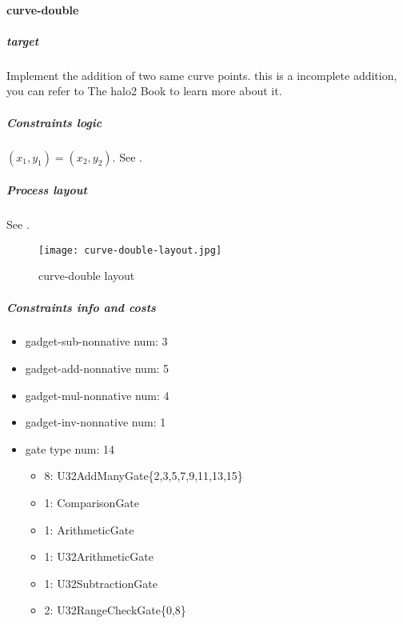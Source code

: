 \paragraph{curve-double}

\subparagraph{target}
Implement the addition of two same curve points. this is a incomplete addition, you can refer to The halo2 Book \cite{website:halo2-book} to learn more about it.

\subparagraph{Constraints logic}
$(x_1,y_1) = (x_2,y_2)$. See .

\subparagraph{Process layout}
See .
\begin{figure}[!ht]
    \centering
    \texttt{[image: curve-double-layout.jpg]}
    \caption{curve-double layout}
    \label{fig:curve-double-layout}
\end{figure}

\subparagraph{Constraints info and costs}
\begin{itemize}
    \item gadget-sub-nonnative num: 3
    \item gadget-add-nonnative num: 5
    \item gadget-mul-nonnative num: 4
    \item gadget-inv-nonnative num: 1
    \item gate type num: 14
        \begin{itemize}
            \item 8: U32AddManyGate\{2,3,5,7,9,11,13,15\}
            \item 1: ComparisonGate
            \item 1: ArithmeticGate
            \item 1: U32ArithmeticGate
            \item 1: U32SubtractionGate
            \item 2: U32RangeCheckGate\{0,8\}
        \end{itemize}
\end{itemize}
